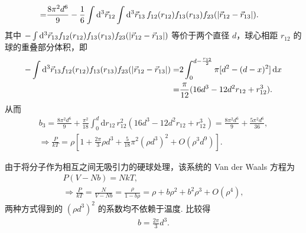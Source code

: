 \documentclass{assignment}
\begin{document}
\begin{pf}
\begin{align}
        =&\frac{8\pi^2d^6}{9}-\frac{1}{6}\int\mathrm{d}^3\vec{r}_{12}\int\mathrm{d}^3\vec{r}_{13}\,f_{12}(r_{12})f_{13}(r_{13})f_{23}(\left\lvert\vec{r}_{12}-\vec{r}_{13}\right\rvert).
    \end{align}
    其中 $-\int\mathrm{d}^3\vec{r}_{13}f_{12}(r_{12})f_{13}(r_{13})f_{23}(\left\lvert\vec{r}_{12}-\vec{r}_{13}\right\rvert)$ 等价于两个直径 $d$，球心相距 $r_{12}$ 的球的重叠部分体积，即
    \begin{align}
        \notag-\int\mathrm{d}^3\vec{r}_{13}f_{12}(r_{12})f_{13}(r_{13})f_{23}(\left\lvert\vec{r}_{12}-\vec{r}_{13}\right\rvert)=&2\int_0^{d-\frac{r_{12}}{2}}\pi[d^2-(d-x)^2]\,\mathrm{d}x\\
        =&\frac{\pi}{12}(16d^3-12d^2r_{12}+r_{12}^3).
    \end{align}
    从而
    \begin{gather}
        b_3=\frac{8\pi^2d^6}{9}+\frac{\pi^2}{18}\int_0^d\mathrm{d}r_{12}\,r_{12}^2(16d^3-12d^2r_{12}+r_{12}^3)=\frac{8\pi^2d^6}{9}+\frac{5\pi^2d^6}{36},\\
        \Longrightarrow\frac{P}{kT}=\rho\left[1+\frac{2\pi}{3}\rho d^3+\frac{5}{18}\pi^2(\rho d^3)^2+O(\rho^3d^9)\right].
    \end{gather}

    由于将分子作为相互之间无吸引力的硬球处理，该系统的 Van der Waals 方程为
    \begin{gather}
        P(V-Nb)=NkT,\\
        \Longrightarrow\frac{P}{kT}=\frac{N}{V-Nb}=\frac{\rho}{1-b\rho}=\rho+b\rho^2+b^2\rho^3+O(\rho^4),
    \end{gather}
    两种方式得到的 $(\rho d^3)^2$ 的系数均不依赖于温度.
    比较得
    \begin{align}
        b=\frac{2\pi}{3}d^3.
    \end{align}
\end{pf}
\end{document}
